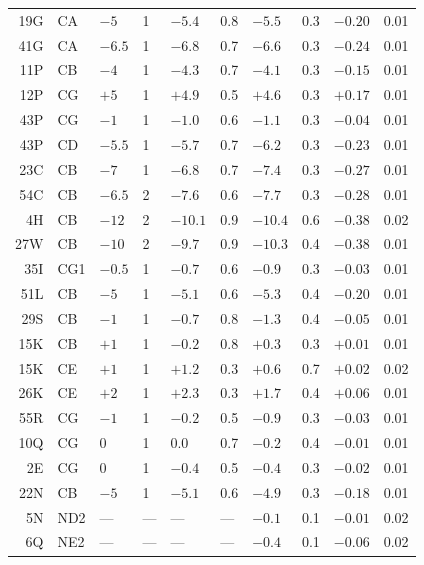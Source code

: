 \documentclass[smallextended]{svjour3}
\begin{document}
\begin{table}
\begin{tabular}{|rl|ll|ll|ll|ll|}
\noalign{\smallskip}\hline\noalign{\smallskip}
19G & CA  & $-5$   & 1 & $-5.4$  & 0.8 & $-5.5$  & 0.3  & $-0.20$  & 0.01 \\
41G & CA  & $-6.5$ & 1 & $-6.8$  & 0.7 & $-6.6$  & 0.3  & $-0.24$  & 0.01 \\
11P & CB  & $-4$   & 1 & $-4.3$  & 0.7 & $-4.1$  & 0.3  & $-0.15$  & 0.01 \\
12P & CG  & $+5$   & 1 & $+4.9$  & 0.5 & $+4.6$  & 0.3  & $+0.17$  & 0.01 \\
43P & CG  & $-1$   & 1 & $-1.0$  & 0.6 & $-1.1$  & 0.3  & $-0.04$  & 0.01 \\
43P & CD  & $-5.5$ & 1 & $-5.7$  & 0.7 & $-6.2$  & 0.3  & $-0.23$  & 0.01 \\
23C & CB  & $-7$   & 1 & $-6.8$  & 0.7 & $-7.4$  & 0.3  & $-0.27$  & 0.01 \\
54C & CB  & $-6.5$ & 2 & $-7.6$  & 0.6 & $-7.7$  & 0.3  & $-0.28$  & 0.01 \\
 4H & CB  & $-12$  & 2 & $-10.1$ & 0.9 & $-10.4$  & 0.6  & $-0.38$  & 0.02 \\
27W & CB  & $-10$  & 2 & $-9.7$  & 0.9 & $-10.3$  & 0.4  & $-0.38$  & 0.01 \\
35I & CG1 & $-0.5$ & 1 & $-0.7$  & 0.6 & $-0.9$  & 0.3  & $-0.03$  & 0.01 \\
51L & CB  & $-5$   & 1 & $-5.1$  & 0.6 & $-5.3$  & 0.4  & $-0.20$  & 0.01 \\
29S & CB  & $-1$   & 1 & $-0.7$  & 0.8 & $-1.3$  & 0.4  & $-0.05$  & 0.01 \\
15K & CB  & $+1$   & 1 & $-0.2$  & 0.8 & $+0.3$  & 0.3  & $+0.01$  & 0.01 \\
15K & CE  & $+1$   & 1 & $+1.2$  & 0.3 & $+0.6$  & 0.7  & $+0.02$  & 0.02 \\
26K & CE  & $+2$   & 1 & $+2.3$  & 0.3 & $+1.7$  & 0.4  & $+0.06$  & 0.01 \\
55R & CG  & $-1$   & 1 & $-0.2$  & 0.5 & $-0.9$  & 0.3  & $-0.03$  & 0.01 \\
10Q & CG  & \M$0$   & 1 & \M$0.0$  & 0.7 & $-0.2$  & 0.4  & $-0.01$  & 0.01 \\
 2E & CG  & \M$0$  & 1 & $-0.4$  & 0.5 & $-0.4$  & 0.3  & $-0.02$  & 0.01 \\
22N & CB  & $-5$   & 1 & $-5.1$  & 0.6 & $-4.9$  & 0.3  & $-0.18$  & 0.01 \\
 5N & ND2 & ---    &---&---      & --- & $-0.1$  & 0.1 & $-0.01$  & 0.02 \\
 6Q & NE2 & ---    &---&---      & --- & $-0.4$  & 0.1 & $-0.06$  & 0.02 \\

\end{tabular}
\end{table}
\end{document}
